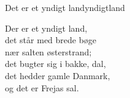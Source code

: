 \begin{song}{Det er et yndigt land}{yndigtland}
\begin{vers}
Der er et yndigt land,\\
det står med brede bøge\\
nær salten østerstrand;\\
det bugter sig i bakke, dal,\\
det hedder gamle Danmark,\\
og det er Frejas sal.\\
\end{vers}
\end{song}
